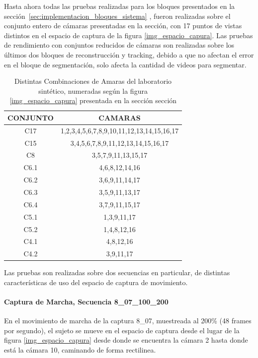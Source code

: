 Hasta ahora todas las pruebas realizadas para los bloques presentados en la sección~\ref{sec:implementacion_bloques_sistema} , fueron realizadas sobre el conjunto entero de cámaras presentadas en la sección\label{seccion_Base_Datos_Sintetica}, con 17 puntos de vistas distintos en el espacio de captura de la figura \ref{img_espacio_capura}. Las pruebas de rendimiento con conjuntos reducidos de cámaras son realizadas sobre los últimos dos bloques de reconstrucción y tracking, debido a que no afectan el error en el bloque de segmentación, solo afecta la cantidad de videos para segmentar.

\begin{table}[h]
\centering
\begin{tabular}{|c|c|}
\hline
\textbf{CONJUNTO} & \textbf{CAMARAS} \\ \hline
C17 & 1,2,3,4,5,6,7,8,9,10,11,12,13,14,15,16,17 \\ \hline
C15 & 3,4,5,6,7,8,9,11,12,13,14,15,16,17 \\ \hline
C8 & 3,5,7,9,11,13,15,17 \\ \hline
C6.1 & 4,6,8,12,14,16 \\ \hline
C6.2 & 3,6,9,11,14,17 \\ \hline
C6.3 & 3,5,9,11,13,17 \\ \hline
C6.4 & 3,7,9,11,15,17 \\ \hline
C5.1 & 1,3,9,11,17 \\ \hline
C5.2 & 1,4,8,12,16 \\ \hline
C4.1 & 4,8,12,16 \\ \hline
C4.2 & 3,9,11,17 \\ \hline
\end{tabular}
\caption{Distintas Combinaciones de Amaras del laboratorio sintético, numeradas según la figura \ref{img_espacio_capura} presentada en la sección sección\label{seccion_Base_Datos_Sintetica} }
\end{table}

Las pruebas son realizadas sobre dos secuencias en particular, de distintas características de uso del espacio de captura de movimiento.

\paragraph{Captura de Marcha, Secuencia 8\_07\_100\_200}

En el movimiento de marcha de la captura 8\_07, muestreada al 200\% (48 frames por segundo), el sujeto se mueve en el espacio de captura desde el lugar de la figura \ref{img_espacio_capura} desde donde se encuentra la cámara 2 hasta donde está la cámara 10, caminando de forma rectilinea.

